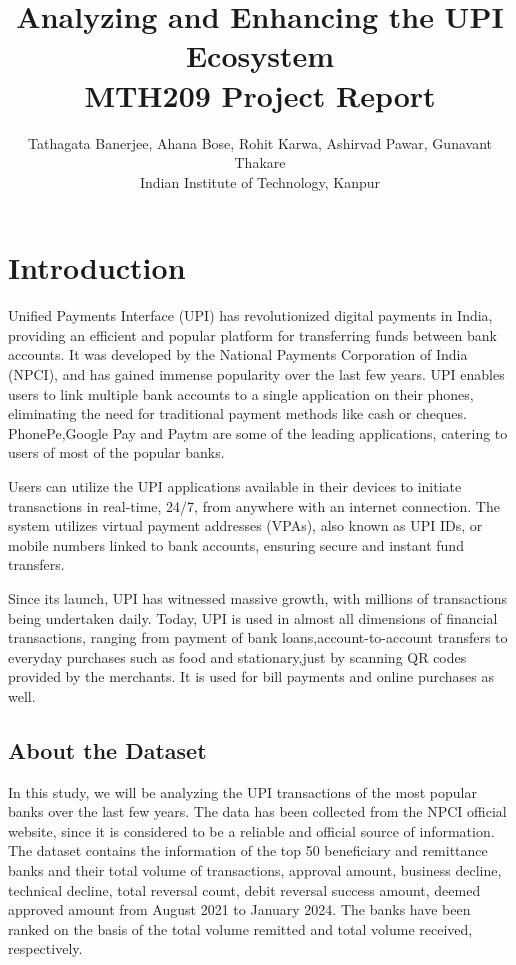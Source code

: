 \documentclass{article}
\title{Analyzing and Enhancing the UPI Ecosystem\\
\normalsize MTH209 Project Report}
\author{Tathagata Banerjee, Ahana Bose, Rohit Karwa, Ashirvad Pawar, Gunavant Thakare \\ 
Indian Institute of Technology, Kanpur}
\begin{document}
\maketitle

\tableofcontents
\newpage
\section{Introduction}

Unified Payments Interface (UPI) has revolutionized digital payments in India, providing an efficient and popular platform for transferring funds between bank accounts. It was developed by the National Payments Corporation of India (NPCI), and has gained immense popularity over the last few years. UPI enables users to link multiple bank accounts to a single application on their phones, eliminating the need for traditional payment methods like cash or cheques. PhonePe,Google Pay and Paytm are some of the leading applications, catering to users of most of the popular banks.

Users can utilize the UPI applications available in their devices to initiate transactions in real-time, 24/7, from anywhere with an internet connection. The system utilizes virtual payment addresses (VPAs), also known as UPI IDs, or mobile numbers linked to bank accounts, ensuring secure and instant fund transfers.

Since its launch, UPI has witnessed massive growth, with millions of transactions being undertaken daily. Today, UPI is used in almost all dimensions of financial transactions, ranging from payment of bank loans,account-to-account transfers to everyday purchases such as food and stationary,just by scanning QR codes provided by the merchants. It is used for bill payments and online purchases as well.

\subsection{About the Dataset}

In this study, we will be analyzing the UPI transactions of the most popular banks over the last few years. The data has been collected from the NPCI official website, since it is considered to be a reliable and official source of information. The dataset contains the information of the top 50 beneficiary and remittance banks and their total volume of transactions, approval amount, business decline, technical decline, total reversal count, debit reversal success amount, deemed approved amount from August 2021 to January 2024. The banks have been ranked on the basis of the total volume remitted and total volume received, respectively.
\end{document}
